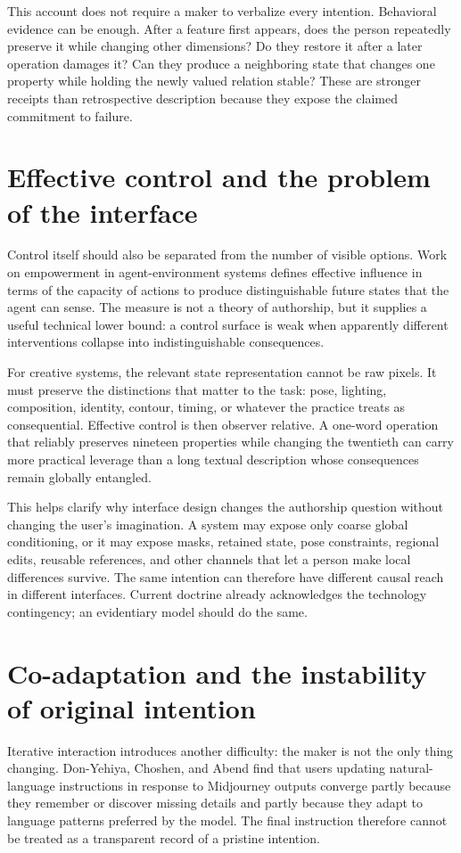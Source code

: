 \documentclass[11pt]{article}
\begin{document}
This account does not require a maker to verbalize every intention. Behavioral evidence can be enough. After a feature first appears, does the person repeatedly preserve it while changing other dimensions? Do they restore it after a later operation damages it? Can they produce a neighboring state that changes one property while holding the newly valued relation stable? These are stronger receipts than retrospective description because they expose the claimed commitment to failure.

\section{Effective control and the problem of the interface}
Control itself should also be separated from the number of visible options. Work on empowerment in agent-environment systems defines effective influence in terms of the capacity of actions to produce distinguishable future states that the agent can sense.\cite{jung2011empowerment} The measure is not a theory of authorship, but it supplies a useful technical lower bound: a control surface is weak when apparently different interventions collapse into indistinguishable consequences.

For creative systems, the relevant state representation cannot be raw pixels. It must preserve the distinctions that matter to the task: pose, lighting, composition, identity, contour, timing, or whatever the practice treats as consequential. Effective control is then observer relative. A one-word operation that reliably preserves nineteen properties while changing the twentieth can carry more practical leverage than a long textual description whose consequences remain globally entangled.

This helps clarify why interface design changes the authorship question without changing the user's imagination. A system may expose only coarse global conditioning, or it may expose masks, retained state, pose constraints, regional edits, reusable references, and other channels that let a person make local differences survive. The same intention can therefore have different causal reach in different interfaces. Current doctrine already acknowledges the technology contingency; an evidentiary model should do the same.

\section{Co-adaptation and the instability of original intention}
Iterative interaction introduces another difficulty: the maker is not the only thing changing. Don-Yehiya, Choshen, and Abend find that users updating natural-language instructions in response to Midjourney outputs converge partly because they remember or discover missing details and partly because they adapt to language patterns preferred by the model.\cite{donyehiya2023human} The final instruction therefore cannot be treated as a transparent record of a pristine intention.
\end{document}
